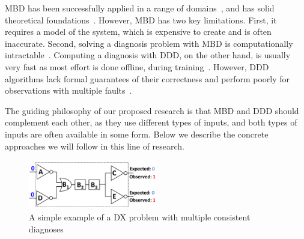 \documentclass[12pt]{article}
\begin{document}
MBD has been successfully applied in a range of domains~\cite{williams96,struss2003model,wotawa2002model}, and has solid theoretical foundations~\cite{deKleer1987diagnosing,reiter1987theory}. However, MBD has two key limitations. First, it requires a model of the system, which is expensive to create and is often inaccurate. Second, solving a diagnosis problem with MBD is computationally intractable~\cite{bylander1991computational}. Computing a diagnosis with DDD, on the other hand, is usually very fast as most effort is done offline, during training~\cite{muralidharan2014fault}. However, DDD algorithms lack formal guarantees of their correctness and perform poorly for observations with multiple faults~\cite{keren2011model}. 


The guiding philosophy of our proposed research is that MBD and DDD should complement each other, as they use different types of inputs, and both types of inputs are often available in some form. 
Below we describe the concrete approaches we will follow in this line of research.



\begin{figure}
    \centering
	\includegraphics[width=0.5\textwidth]{mbd-example_cropped.pdf}
    \caption{A simple example of a DX problem with multiple consistent diagnoses}
    \label{fig:mbd-example}
\end{figure}
\end{document}
